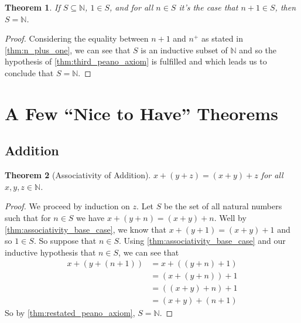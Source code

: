 \documentclass{article}
\theoremstyle{definition}
\theoremstyle{definition}
\theoremstyle{plain}
\theoremstyle{remark}
\theoremstyle{plain}
\newtheorem{theorem}{Theorem}[section]
\theoremstyle{remark}
\theoremstyle{plain}
\theoremstyle{plain}
\theoremstyle{plain}
\theoremstyle{plain}
\begin{document}
\begin{theorem}
  If \( S \subseteq \mathbb{N} \), \( 1 \in S \), and for all \( n \in S \) it's 
  the case that \( n + 1 \in S \), then \( S = \mathbb{N} \).
  \label{thm:restated_peano_axiom}
\end{theorem}

\begin{proof}
  Considering the equality between \( n + 1 \) and \( n^{+} \) as stated 
  in \autoref{thm:n_plus_one}, we can see that \( S \) is an inductive subset
  of \( \mathbb{N} \) and so the hypothesis of \autoref{thm:third_peano_axiom} 
  is fulfilled and which leads us to conclude that \( S = \mathbb{N} \).
\end{proof}

\newpage

\section{A Few ``Nice to Have'' Theorems}

\subsection{Addition}

\begin{theorem}[Associativity of Addition]
 \( x + ( y + z )  = (x + y) + z \) for all \( x, y, z \in \mathbb{N} \).
 \label{thm:associativity_of_addition}
\end{theorem}

\begin{proof}
  We proceed by induction on \( z \). Let \( S \) be the set of all natural 
  numbers such that for \( n \in S \) we have \( x + (y + n) = (x + y) + n\). 
  Well by \autoref{thm:associativity_base_case}, we know that 
  \( x + (y + 1) = (x + y) + 1 \) and so \( 1 \in S \). So suppose that 
  \( n \in S \). Using \autoref{thm:associativity_base_case} and our inductive 
  hypothesis that \( n \in S \), we can see that
  \begin{align*}
    x + (y + (n + 1)) &= x + ((y + n) + 1) \\
                      &= (x + (y + n)) + 1 \\
                      &= ((x + y) + n) + 1 \\
                      &= (x + y) + (n + 1)
  \end{align*}
  So by \autoref{thm:restated_peano_axiom}, \( S = \mathbb{N} \).
\end{proof}
\end{document}

